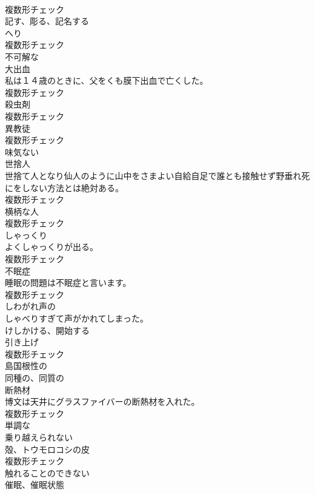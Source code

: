 \documentclass[8pt]{extreport}
\begin{document}
\begin{CJK}{UTF8}{min}
\\	複数形チェック
\\	[動詞]	記す、彫る、記名する	
\\	[名詞]	へり	
\\	複数形チェック
\\	[形容詞]	不可解な	
\\	[名詞]	大出血	
\\	私は１４歳のときに、父をくも膜下出血で亡くした。	
\\	複数形チェック
\\	[名詞]	殺虫剤	
\\	複数形チェック
\\	[名詞]	異教徒	
\\	複数形チェック
\\	[形容詞]	味気ない	
\\	[名詞]	世捨人	
\\	世捨て人となり仙人のように山中をさまよい自給自足で誰とも接触せず野垂れ死にをしない方法とは絶対ある。	
\\	複数形チェック
\\	[名詞]	横柄な人	
\\	複数形チェック
\\	[名詞]	しゃっくり	
\\	よくしゃっくりが出る。	
\\	複数形チェック
\\	[名詞]	不眠症	
\\	睡眠の問題は不眠症と言います。	
\\	複数形チェック
\\	[形容詞]	しわがれ声の	
\\	しゃべりすぎて声がかれてしまった。	
\\	[動詞]	けしかける、開始する	
\\	[名詞]	引き上げ	
\\	複数形チェック
\\	[形容詞]	島国根性の	
\\	[形容詞]	同種の、同質の	
\\	[名詞]	断熱材	
\\	博文は天井にグラスファイバーの断熱材を入れた。	
\\	複数形チェック
\\	[形容詞]	単調な	
\\	[形容詞]	乗り越えられない	
\\	[名詞]	殻、トウモロコシの皮	
\\	複数形チェック
\\	[形容詞]	触れることのできない	
\\	[名詞]	催眠、催眠状態	

\end{CJK}
\end{document}
